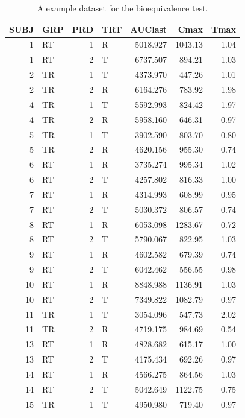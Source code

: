 \documentclass[
  12pt,
]{krantz}
\begin{document}
\begin{table}

\caption{\label{tab:beconcdata}A example dataset for the bioequivalence test.}
\centering
\begin{tabular}[t]{r|l|r|l|r|r|r}
\hline
SUBJ & GRP & PRD & TRT & AUClast & Cmax & Tmax\\
\hline
1 & RT & 1 & R & 5018.927 & 1043.13 & 1.04\\
\hline
1 & RT & 2 & T & 6737.507 & 894.21 & 1.03\\
\hline
2 & TR & 1 & T & 4373.970 & 447.26 & 1.01\\
\hline
2 & TR & 2 & R & 6164.276 & 783.92 & 1.98\\
\hline
4 & TR & 1 & T & 5592.993 & 824.42 & 1.97\\
\hline
4 & TR & 2 & R & 5958.160 & 646.31 & 0.97\\
\hline
5 & TR & 1 & T & 3902.590 & 803.70 & 0.80\\
\hline
5 & TR & 2 & R & 4620.156 & 955.30 & 0.74\\
\hline
6 & RT & 1 & R & 3735.274 & 995.34 & 1.02\\
\hline
6 & RT & 2 & T & 4257.802 & 816.33 & 1.00\\
\hline
7 & RT & 1 & R & 4314.993 & 608.99 & 0.95\\
\hline
7 & RT & 2 & T & 5030.372 & 806.57 & 0.74\\
\hline
8 & RT & 1 & R & 6053.098 & 1283.67 & 0.72\\
\hline
8 & RT & 2 & T & 5790.067 & 822.95 & 1.03\\
\hline
9 & RT & 1 & R & 4602.582 & 679.39 & 0.74\\
\hline
9 & RT & 2 & T & 6042.462 & 556.55 & 0.98\\
\hline
10 & RT & 1 & R & 8848.988 & 1136.91 & 1.03\\
\hline
10 & RT & 2 & T & 7349.822 & 1082.79 & 0.97\\
\hline
11 & TR & 1 & T & 3054.096 & 547.73 & 2.02\\
\hline
11 & TR & 2 & R & 4719.175 & 984.69 & 0.54\\
\hline
13 & RT & 1 & R & 4828.682 & 615.17 & 1.00\\
\hline
13 & RT & 2 & T & 4175.434 & 692.26 & 0.97\\
\hline
14 & RT & 1 & R & 4566.275 & 864.56 & 1.03\\
\hline
14 & RT & 2 & T & 5042.649 & 1122.75 & 0.75\\
\hline
15 & TR & 1 & T & 4950.980 & 719.40 & 0.97\\

\end{tabular}
\end{table}
\end{document}
